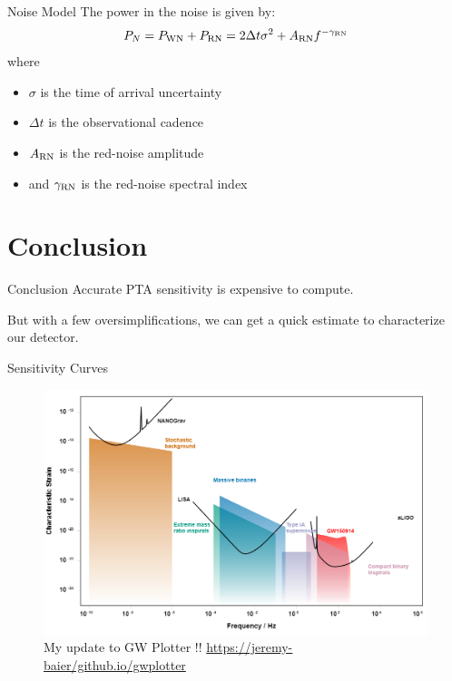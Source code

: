 \documentclass{beamer}
\begin{document}
\begin{frame}{Noise Model}
    The power in the noise is given by:
    \[
    P_{N} = P_{\rm WN} + P_{\rm RN} = 2\Delta t\sigma^2 + A_{\rm RN}f^{-\gamma_{\rm RN}}
    \]
    where 
    \begin{itemize}
        \item $\sigma$ is the time of arrival uncertainty
        \item $\Delta t$ is the observational cadence
        \item $A_{\rm RN}$ is the red-noise amplitude
        \item and $\gamma_{\rm RN}$ is the red-noise spectral index
    \end{itemize}
\end{frame}

\section{Conclusion}
\begin{frame}{Conclusion}
    Accurate PTA sensitivity is expensive to compute.

    But with a few oversimplifications, we can get a quick estimate to characterize our detector.
\end{frame}

\begin{frame}{Sensitivity Curves}
    \begin{figure}
        \centering
        \includegraphics[width=\linewidth]{figs/my_gwplotter.png}
        \caption{My update to GW Plotter !!
        \centering \url{https://jeremy-baier/github.io/gwplotter}
        }
        \label{fig:sensitivity_curve}
    \end{figure}
\end{frame}
\end{document}
